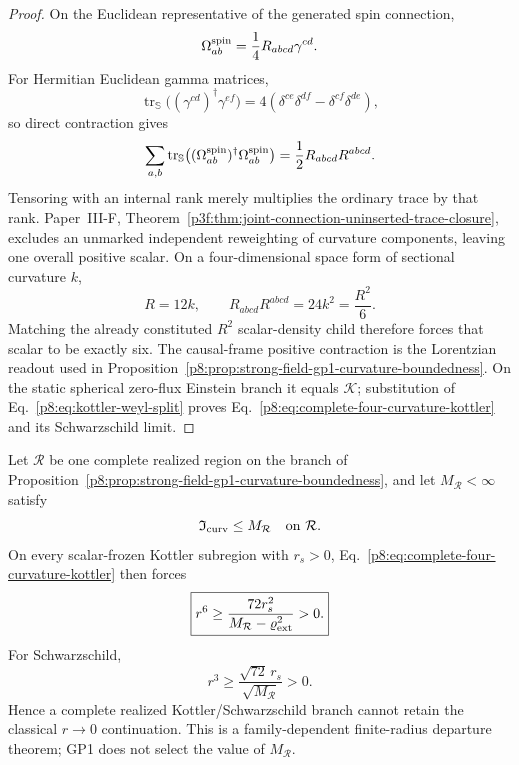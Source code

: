 \documentclass[12pt,a4paper]{article}
\begin{document}
\begin{proof}
On the Euclidean representative of the generated spin connection,
\[
 \Omega^{\rm spin}_{ab}=\frac14R_{ab cd}\gamma^{cd}.
\]
For Hermitian Euclidean gamma matrices,
\[
 \operatorname{tr}_{\mathbb S}
 \bigl((\gamma^{cd})^\dagger\gamma^{ef}\bigr)
 =4(\delta^{ce}\delta^{df}-\delta^{cf}\delta^{de}),
\]
so direct contraction gives
\[
 \sum_{a,b}\operatorname{tr}_{\mathbb S}
 \bigl((\Omega^{\rm spin}_{ab})^\dagger
             \Omega^{\rm spin}_{ab}\bigr)
 =\frac12 R_{abcd}R^{abcd}.
\]
Tensoring with an internal rank merely multiplies the ordinary trace by that
rank.  Paper~III-F,
Theorem~\ref{p3f:thm:joint-connection-uninserted-trace-closure}, excludes an
unmarked independent reweighting of curvature components, leaving one overall
positive scalar.  On a four-dimensional space form of sectional curvature
\(k\),
\[
 R=12k,\qquad R_{abcd}R^{abcd}=24k^2=\frac{R^2}{6}.
\]
Matching the already constituted \(R^2\) scalar-density child therefore
forces that scalar to be exactly six.  The causal-frame positive contraction
is the Lorentzian readout used in
Proposition~\ref{p8:prop:strong-field-gp1-curvature-boundedness}.  On the
static spherical zero-flux Einstein branch it equals \(\mathscr K\);
substitution of Eq.~\eqref{p8:eq:kottler-weyl-split} proves
Eq.~\eqref{p8:eq:complete-four-curvature-kottler} and its Schwarzschild
limit.
\end{proof}


\begin{corollary}
\label{p8:cor:v2181-gp1-classical-kottler-departure}
Let \(\mathcal R\) be one complete realized region on the branch of
Proposition~\ref{p8:prop:strong-field-gp1-curvature-boundedness}, and let
\(M_{\mathcal R}<\infty\) satisfy
\[
 \mathfrak I_{\rm curv}\le M_{\mathcal R}
 \quad\hbox{on }\mathcal R.
\]
On every scalar-frozen Kottler subregion with \(r_s>0\),
Eq.~\eqref{p8:eq:complete-four-curvature-kottler} then forces
\begin{equation}
\label{p8:eq:v2181-family-dependent-kottler-departure}
 \boxed{
 r^6\ge
 \frac{72r_s^2}{M_{\mathcal R}-\varrho_{\rm ext}^2}>0.}
\end{equation}
For Schwarzschild,
\begin{equation}
\label{p8:eq:v2181-family-dependent-schwarzschild-departure}
 \boxed{
 r^3\ge\frac{\sqrt{72}\,r_s}{\sqrt{M_{\mathcal R}}}>0.}
\end{equation}
Hence a complete realized Kottler/Schwarzschild branch cannot retain the
classical \(r\to0\) continuation.  This is a family-dependent finite-radius
departure theorem; GP1 does not select the value of \(M_{\mathcal R}\).
\end{corollary}
\end{document}

